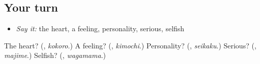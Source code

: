 \subsection*{Your turn}
\begin{itemize}
\raggedright
  \item \emph{Say it:} the heart, a feeling, personality, serious, selfish
\end{itemize}

\begin{tcolorbox}[breakable,colback=teal!4,colframe=teal!35!black,title={Before you move on}]
The heart? (\textbf{}, \emph{kokoro}.) A feeling? (\textbf{}, \emph{kimochi}.) Personality? (\textbf{}, \emph{seikaku}.) Serious? (\textbf{}, \emph{majime}.) Selfish? (\textbf{}, \emph{wagamama}.)
\end{tcolorbox}
